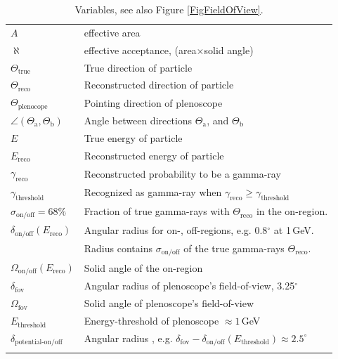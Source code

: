 \documentclass[a4paper,12pt,oneside]{article}
\begin{document}
\begin{table}[H]
\begin{tabular}{ll}
\hline\noalign{\smallskip}
$A$ & effective area\\
$\aleph$ & effective acceptance, (area$\times$solid angle)\\
$\Theta_\text{true}$ & True direction of particle\\
$\Theta_\text{reco}$ & Reconstructed direction of particle\\
$\Theta_\text{plenocope}$ & Pointing direction of plenoscope\\
$\angle(\Theta_\text{a}, \Theta_\text{b})$ & Angle between directions $\Theta_\text{a}$, and $\Theta_\text{b}$\\
$E$ & True energy of particle\\
$E_\text{reco}$ & Reconstructed energy of particle\\
$\gamma_\text{reco}$ & Reconstructed probability to be a gamma-ray \\
$\gamma_\text{threshold}$ & Recognized as gamma-ray when $\gamma_\text{reco} \geq \gamma_\text{threshold}$\\
$\sigma_\text{on/off} = 68\%$ & Fraction of true gamma-rays with $\Theta_\text{reco}$ in the on-region.\\
$\delta_\text{on/off}(E_\text{reco})$ & Angular radius for on-, off-regions, e.g. 0.8$^\circ$ at 1\,GeV.\\
 & \hspace{0.5cm}Radius contains $\sigma_\text{on/off}$ of the true gamma-rays $\Theta_\text{reco}$.\\
$\Omega_\text{on/off}(E_\text{reco})$ & Solid angle of the on-region\\
$\delta_\text{fov}$ & Angular radius of plenoscope's field-of-view, 3.25$^\circ$\\
$\Omega_\text{fov}$ & Solid angle of plenoscope's field-of-view\\
$E_\text{threshold}$ & Energy-threshold of plenoscope $\approx 1\,$GeV\\
$\delta_\text{potential-on/off}$ & Angular radius , e.g. $\delta_\text{fov} - \delta_\text{on/off}(E_\text{threshold}) \approx 2.5^\circ$\\
\noalign{\smallskip}\hline
\end{tabular}
\caption{Variables, see also Figure \ref{FigFieldOfView}.}
\label{TabVariables}
\end{table}
%
%
\end{document}

